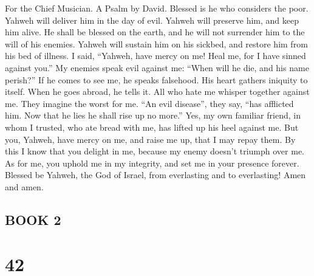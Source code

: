 For the Chief Musician. A Psalm by David.  Blessed is he who
considers the poor. Yahweh will deliver him in the day of evil.
 Yahweh will preserve him, and keep him alive. He shall be
blessed on the earth, and he will not surrender him to the will of his
enemies.  Yahweh will sustain him on his sickbed, and
restore him from his bed of illness.  I said, ``Yahweh, have
mercy on me! Heal me, for I have sinned against you.''  My
enemies speak evil against me: ``When will he die, and his name
perish?''  If he comes to see me, he speaks falsehood. His
heart gathers iniquity to itself. When he goes abroad, he tells it.
 All who hate me whisper together against me. They imagine
the worst for me.  ``An evil disease'', they say, ``has
afflicted him. Now that he lies he shall rise up no more.'' 
Yes, my own familiar friend, in whom I trusted, who ate bread with me,
has lifted up his heel against me.  But you, Yahweh, have
mercy on me, and raise me up, that I may repay them.  By
this I know that you delight in me, because my enemy doesn't triumph
over me.  As for me, you uphold me in my integrity, and set
me in your presence forever.  Blessed be Yahweh, the God of
Israel, from everlasting and to everlasting! Amen and amen.

\hypertarget{book-2}{%
\subsection{BOOK 2}\label{book-2}}

\hypertarget{section-41}{%
\section{42}\label{section-41}}

